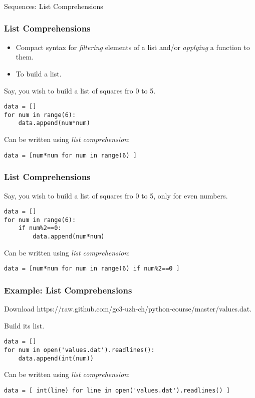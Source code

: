 \begin{frame}[fragile]\frametitle{}
\begin{center}
{\Large Sequences: List Comprehensions}
\end{center}
\end{frame}

\begin{frame}[fragile]\frametitle{List Comprehensions}
  \begin{itemize}
  \item Compact syntax for \emph{filtering} elements  of a list and/or \emph{applying} a function to them.
\item To build a list.
\end{itemize}
Say, you wish to build a list of squares fro 0 to 5.
  \begin{lstlisting}
data = []
for num in range(6):
    data.append(num*num)
  \end{lstlisting}
  
 Can be written using \textit{list comprehension}:
  \begin{lstlisting}
data = [num*num for num in range(6) ]
  \end{lstlisting}

\end{frame}

\begin{frame}[fragile]\frametitle{List Comprehensions}
Say, you wish to build a list of squares fro 0 to 5, only for even numbers.
  \begin{lstlisting}
data = []
for num in range(6):
    if num%2==0:
        data.append(num*num)
  \end{lstlisting}
  
 Can be written using \textit{list comprehension}:
  \begin{lstlisting}
data = [num*num for num in range(6) if num%2==0 ]
  \end{lstlisting}

\end{frame}

\begin{frame}[fragile]\frametitle{Example: List Comprehensions}
 
Download  https://raw.github.com/gc3-uzh-ch/python-course/master/values.dat.

Build its list.
  \begin{lstlisting}
data = []
for num in open('values.dat').readlines():
    data.append(int(num))
  \end{lstlisting}
  
 Can be written using \textit{list comprehension}:
  \begin{lstlisting}
data = [ int(line) for line in open('values.dat').readlines() ]
  \end{lstlisting}

\end{frame}

